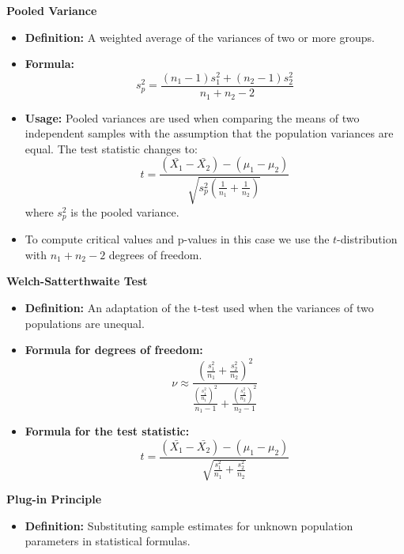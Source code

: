 \documentclass{article}
\begin{document}
\textbf{Pooled Variance}
\begin{itemize}
    \item \textbf{Definition:} A weighted average of the variances of two or more groups.
    \item \textbf{Formula:}
    \[
    s_p^2 = \frac{(n_1 - 1)s_1^2 + (n_2 - 1)s_2^2}{n_1 + n_2 - 2}
    \]
    \item \textbf{Usage:} Pooled variances are used when comparing the means of two independent samples with the assumption that the population variances are equal. The test statistic changes to:
    \[
    t = \frac{(\bar{X_1} - \bar{X_2}) - (\mu_1 - \mu_2)}{\sqrt{s_p^2 \left( \frac{1}{n_1} + \frac{1}{n_2} \right)}}
    \]
    where \(s_p^2\) is the pooled variance.
    \item To compute critical values and p-values in this case we use the $t$-distribution with $n_1+n_2-2$ degrees of freedom.
\end{itemize}

\textbf{Welch-Satterthwaite Test}
\begin{itemize}
    \item \textbf{Definition:} An adaptation of the t-test used when the variances of two populations are unequal.
    \item \textbf{Formula for degrees of freedom:}
    \[
    \nu \approx \frac{\left(\frac{s_1^2}{n_1} + \frac{s_2^2}{n_2}\right)^2}{\frac{\left(\frac{s_1^2}{n_1}\right)^2}{n_1 - 1} + \frac{\left(\frac{s_2^2}{n_2}\right)^2}{n_2 - 1}}
    \]
    \item \textbf{Formula for the test statistic:}
    \[
    t = \frac{(\bar{X_1} - \bar{X_2}) - (\mu_1 - \mu_2)}{\sqrt{\frac{s_1^2}{n_1} + \frac{s_2^2}{n_2}}}
    \]
\end{itemize}

\textbf{Plug-in Principle}
\begin{itemize}
    \item \textbf{Definition:} Substituting sample estimates for unknown population parameters in statistical formulas.
\end{itemize}
\end{document}
